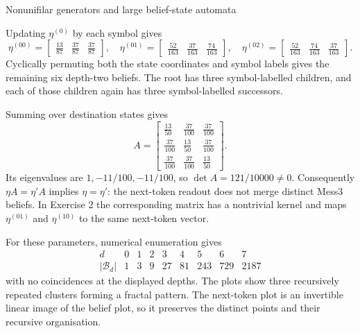 {\begin{exercise}[Extension]{Nonunifilar generators and large belief-state automata}
\begin{solution}
\begin{parts}
\begin{subparts}
          \item Updating $\eta^{(0)}$ by each symbol gives
            \[
              \eta^{(00)}=
                \begin{bmatrix}\tfrac{13}{87}&\tfrac{37}{87}&\tfrac{37}{87}\end{bmatrix},
              \quad
              \eta^{(01)}=
                \begin{bmatrix}\tfrac{52}{163}&\tfrac{37}{163}&\tfrac{74}{163}\end{bmatrix},
              \quad
              \eta^{(02)}=
                \begin{bmatrix}\tfrac{52}{163}&\tfrac{74}{163}&\tfrac{37}{163}\end{bmatrix}.
            \]
            Cyclically permuting both the state coordinates and symbol labels
            gives the remaining six depth-two beliefs. The root has three
            symbol-labelled children, and each of those children again has
            three symbol-labelled successors.

          \item Summing over destination states gives
            \[
              A=\begin{bmatrix}
                \tfrac{13}{50}&\tfrac{37}{100}&\tfrac{37}{100}\\
                \tfrac{37}{100}&\tfrac{13}{50}&\tfrac{37}{100}\\
                \tfrac{37}{100}&\tfrac{37}{100}&\tfrac{13}{50}
              \end{bmatrix}.
            \]
            Its eigenvalues are $1,-11/100,-11/100$, so
            $\det A=121/10000\neq0$. Consequently
            $\eta A=\eta' A$ implies $\eta=\eta'$: the next-token readout
            does not merge distinct Mess3 beliefs. In Exercise 2 the
            corresponding matrix has a nontrivial kernel and maps
            $\eta^{(01)}$ and $\eta^{(10)}$ to the same next-token vector.

          \item For these parameters, numerical enumeration gives
            \[
              \begin{array}{c|rrrrrrrr}
                d&0&1&2&3&4&5&6&7\\ \hline
                |\mathcal B_d|&1&3&9&27&81&243&729&2187
              \end{array}
            \]
            with no coincidences at the displayed depths. The plots show
            three recursively repeated clusters forming a fractal pattern.
            The next-token plot is an invertible linear image of the belief
            plot, so it preserves the distinct points and their recursive
            organisation.


\end{subparts}
\end{parts}
\end{solution}
\end{exercise}}
